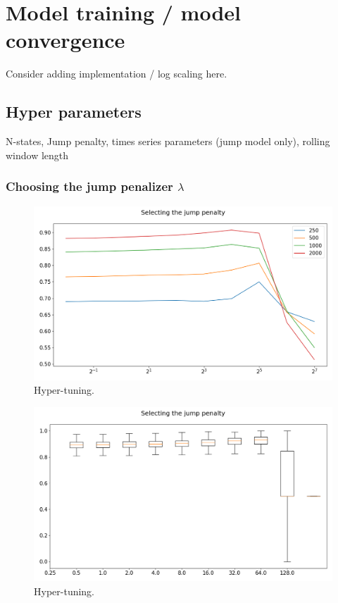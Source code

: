\newpage

\section{Model training / model convergence}

Consider adding implementation / log scaling here.
 
\subsection{Hyper parameters}
 
N-states, Jump penalty, times series parameters (jump model only), rolling window length
 
\subsubsection{Choosing the jump penalizer $\lambda$}

\begin{figure}[H] 
    \centering
    \includegraphics[width=1\textwidth]{analysis/model_convergence/images/jump_penalties.png}
    \caption{Hyper-tuning.}
    \label{fig:jump_penalties}
\end{figure}

\begin{figure}[H] 
    \centering
    \includegraphics[width=1\textwidth]{analysis/model_convergence/images/jump_penalties_box.png}
    \caption{Hyper-tuning.}
    \label{fig:jump_penalties}
\end{figure}



